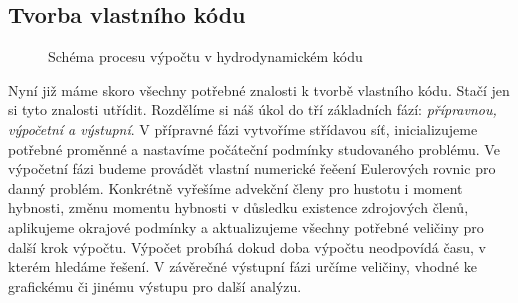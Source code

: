 \subsection{Tvorba vlastního kódu}
\begin{figure}
\centering
{}
\caption{Schéma procesu výpočtu v hydrodynamickém kódu}
\label{figure:schema}
\end{figure}
Nyní již máme skoro všechny potřebné znalosti k tvorbě vlastního kódu. Stačí jen si tyto znalosti utřídit. Rozdělíme si náš úkol do tří základních fází: {\it přípravnou, výpočetní a výstupní}. V přípravné fázi vytvoříme střídavou síť, inicializujeme potřebné proměnné a nastavíme počáteční podmínky studovaného problému. Ve výpočetní fázi budeme provádět vlastní numerické řeěení Eulerových rovnic pro danný problém. Konkrétně vyřešíme advekční členy pro hustotu i moment hybnosti, změnu momentu hybnosti v důsledku existence zdrojových členů, aplikujeme okrajové podmínky a aktualizujeme všechny potřebné veličiny pro další krok výpočtu. Výpočet probíhá dokud doba výpočtu neodpovídá času, v kterém hledáme řešení. V závěrečné výstupní fázi určíme veličiny, vhodné ke grafickému či jinému výstupu pro další analýzu.

